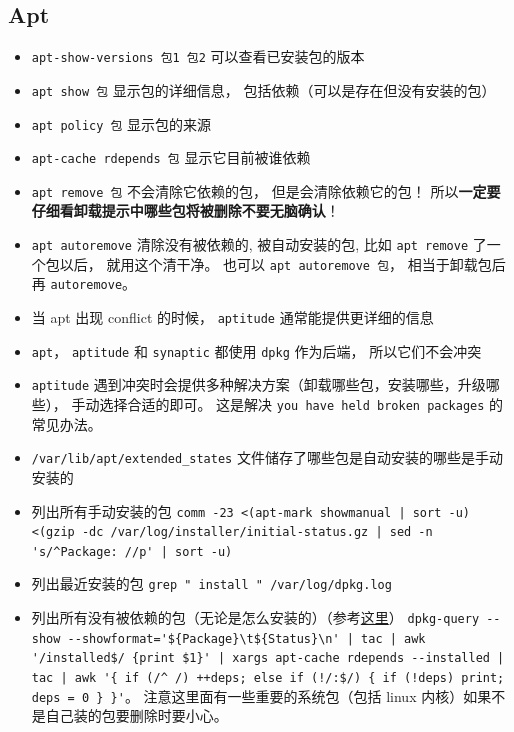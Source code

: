 
\begin{issues}
\issueDraft
\end{issues}



\subsection{Apt}
\begin{itemize}
\item \verb`apt-show-versions 包1 包2` 可以查看已安装包的版本
\item \verb`apt show 包` 显示包的详细信息， 包括依赖（可以是存在但没有安装的包）
\item \verb`apt policy 包` 显示包的来源
\item \verb`apt-cache rdepends 包` 显示它目前被谁依赖
\item \verb`apt remove 包` 不会清除它依赖的包， 但是会清除依赖它的包！ 所以\textbf{一定要仔细看卸载提示中哪些包将被删除不要无脑确认}！
\item \verb`apt autoremove` 清除没有被依赖的, 被自动安装的包, 比如 \verb`apt remove` 了一个包以后， 就用这个清干净。 也可以 \verb`apt autoremove 包`， 相当于卸载包后再 \verb`autoremove`。
\item 当 apt 出现 conflict 的时候， \verb`aptitude` 通常能提供更详细的信息
\item \verb`apt`， \verb`aptitude` 和 \verb`synaptic` 都使用 \verb`dpkg` 作为后端， 所以它们不会冲突
\item \verb`aptitude` 遇到冲突时会提供多种解决方案（卸载哪些包，安装哪些，升级哪些）， 手动选择合适的即可。 这是解决 \verb`you have held broken packages` 的常见办法。
\item \verb`/var/lib/apt/extended_states` 文件储存了哪些包是自动安装的哪些是手动安装的
\item 列出所有手动安装的包 \verb`comm -23 <(apt-mark showmanual | sort -u) <(gzip -dc /var/log/installer/initial-status.gz | sed -n 's/^Package: //p' | sort -u)`
\item 列出最近安装的包 \verb`grep " install " /var/log/dpkg.log`
\item 列出所有没有被依赖的包（无论是怎么安装的）（参考\href{https://askubuntu.com/questions/1114733/how-do-i-list-all-packages-that-no-package-depends-on}{这里}） \verb`dpkg-query --show --showformat='${Package}\t${Status}\n' | tac | awk '/installed$/ {print $1}' | xargs apt-cache rdepends --installed | tac | awk '{ if (/^ /) ++deps; else if (!/:$/) { if (!deps) print; deps = 0 } }'`。 注意这里面有一些重要的系统包（包括 linux 内核）如果不是自己装的包要删除时要小心。

\end{itemize}
